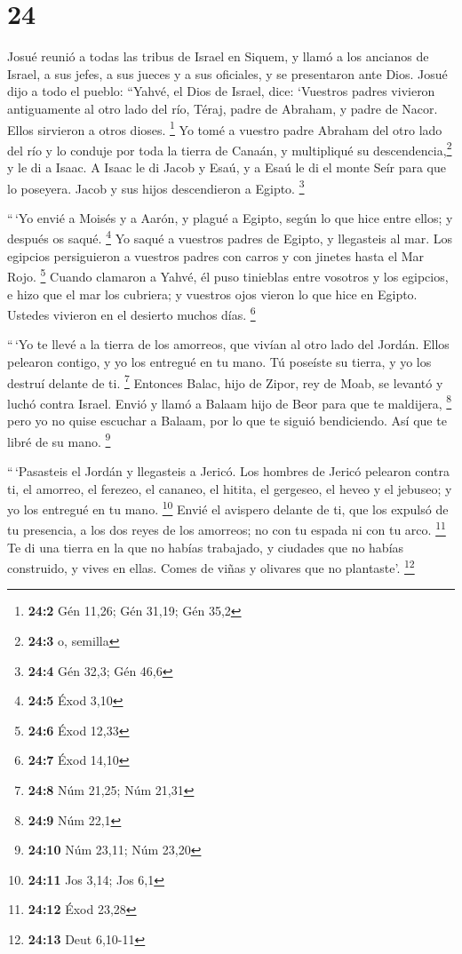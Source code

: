 \hypertarget{section-23}{%
\section{24}\label{section-23}}

 Josué reunió a todas las tribus de Israel en Siquem, y
llamó a los ancianos de Israel, a sus jefes, a sus jueces y a sus
oficiales, y se presentaron ante Dios.  Josué dijo a todo
el pueblo: ``Yahvé, el Dios de Israel, dice: `Vuestros padres vivieron
antiguamente al otro lado del río, Téraj, padre de Abraham, y padre de
Nacor. Ellos sirvieron a otros dioses. \footnote{\textbf{24:2} Gén
  11,26; Gén 31,19; Gén 35,2}  Yo tomé a vuestro padre
Abraham del otro lado del río y lo conduje por toda la tierra de Canaán,
y multipliqué su descendencia,\footnote{\textbf{24:3} o, semilla} y le
di a Isaac.  A Isaac le di Jacob y Esaú, y a Esaú le di el
monte Seír para que lo poseyera. Jacob y sus hijos descendieron a
Egipto. \footnote{\textbf{24:4} Gén 32,3; Gén 46,6}

 ``\,`Yo envié a Moisés y a Aarón, y plagué a Egipto,
según lo que hice entre ellos; y después os saqué. \footnote{\textbf{24:5}
  Éxod 3,10}  Yo saqué a vuestros padres de Egipto, y
llegasteis al mar. Los egipcios persiguieron a vuestros padres con
carros y con jinetes hasta el Mar Rojo. \footnote{\textbf{24:6} Éxod
  12,33}  Cuando clamaron a Yahvé, él puso tinieblas entre
vosotros y los egipcios, e hizo que el mar los cubriera; y vuestros ojos
vieron lo que hice en Egipto. Ustedes vivieron en el desierto muchos
días. \footnote{\textbf{24:7} Éxod 14,10}

 ``\,`Yo te llevé a la tierra de los amorreos, que vivían
al otro lado del Jordán. Ellos pelearon contigo, y yo los entregué en tu
mano. Tú poseíste su tierra, y yo los destruí delante de ti. \footnote{\textbf{24:8}
  Núm 21,25; Núm 21,31}  Entonces Balac, hijo de Zipor,
rey de Moab, se levantó y luchó contra Israel. Envió y llamó a Balaam
hijo de Beor para que te maldijera, \footnote{\textbf{24:9} Núm 22,1}
 pero yo no quise escuchar a Balaam, por lo que te siguió
bendiciendo. Así que te libré de su mano. \footnote{\textbf{24:10} Núm
  23,11; Núm 23,20}

 ``\,`Pasasteis el Jordán y llegasteis a Jericó. Los
hombres de Jericó pelearon contra ti, el amorreo, el ferezeo, el
cananeo, el hitita, el gergeseo, el heveo y el jebuseo; y yo los
entregué en tu mano. \footnote{\textbf{24:11} Jos 3,14; Jos 6,1}
 Envié el avispero delante de ti, que los expulsó de tu
presencia, a los dos reyes de los amorreos; no con tu espada ni con tu
arco. \footnote{\textbf{24:12} Éxod 23,28}  Te di una
tierra en la que no habías trabajado, y ciudades que no habías
construido, y vives en ellas. Comes de viñas y olivares que no
plantaste'. \footnote{\textbf{24:13} Deut 6,10-11}

